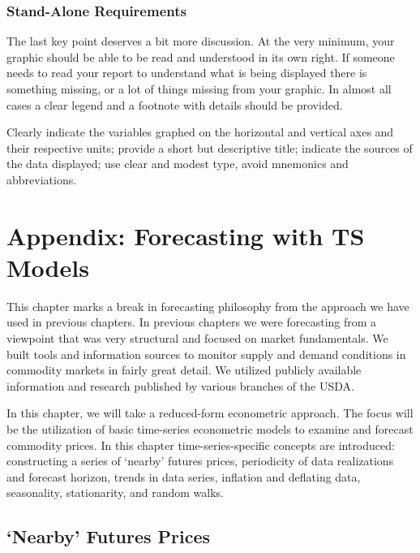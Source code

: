 \documentclass[]{book}
\theoremstyle{definition}
\theoremstyle{definition}
\theoremstyle{remark}
\begin{document}
\subsection{Stand-Alone Requirements}\label{stand-alone-requirements}

The last key point deserves a bit more discussion. At the very minimum,
your graphic should be able to be read and understood in its own right.
If someone needs to read your report to understand what is being
displayed there is something missing, or a lot of things missing from
your graphic. In almost all cases a clear legend and a footnote with
details should be provided.

Clearly indicate the variables graphed on the horizontal and vertical
axes and their respective units; provide a short but descriptive title;
indicate the sources of the data displayed; use clear and modest type,
avoid mnemonics and abbreviations.

\chapter{Appendix: Forecasting with TS
Models}\label{appendix-forecasting-with-ts-models}

This chapter marks a break in forecasting philosophy from the approach
we have used in previous chapters. In previous chapters we were
forecasting from a viewpoint that was very structural and focused on
market fundamentals. We built tools and information sources to monitor
supply and demand conditions in commodity markets in fairly great
detail. We utilized publicly available information and research
published by various branches of the USDA.

In this chapter, we will take a reduced-form econometric approach. The
focus will be the utilization of basic time-series econometric models to
examine and forecast commodity prices. In this chapter
time-series-specific concepts are introduced: constructing a series of
`nearby' futures prices, periodicity of data realizations and forecast
horizon, trends in data series, inflation and deflating data,
seasonality, stationarity, and random walks.

\section{\texorpdfstring{`Nearby' Futures
Prices}{Nearby Futures Prices}}\label{nearby-futures-prices}
\end{document}
